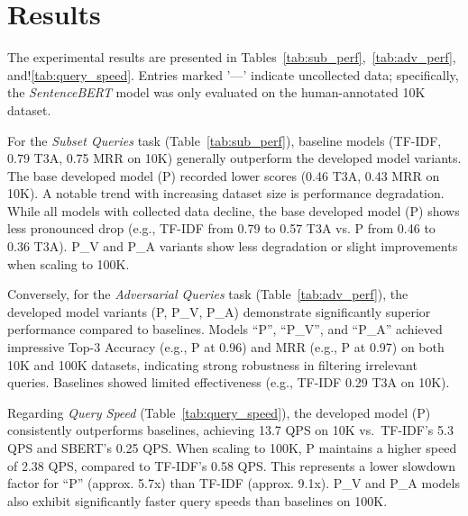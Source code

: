 \documentclass[11pt]{article}
\begin{document}
\section{Results}\label{sec:res}
The experimental results are presented in
Tables~\ref{tab:sub_perf},~\ref{tab:adv_perf}, and!\ref{tab:query_speed}.
Entries marked '---' indicate uncollected data; specifically, the
\emph{SentenceBERT} model was only evaluated on the human-annotated 10K
dataset.

For the \emph{Subset Queries} task (Table~\ref{tab:sub_perf}), baseline models
(TF-IDF, 0.79 T3A, 0.75 MRR on 10K) generally outperform the developed model
variants.
The base developed model (P) recorded lower scores (0.46 T3A, 0.43 MRR on 10K).
A notable trend with increasing dataset size is performance degradation.
While all models with collected data decline, the base developed model (P) shows
less pronounced drop (e.g., TF-IDF from 0.79 to 0.57 T3A vs. P from 0.46 to 0.36
T3A). P\_V and P\_A variants show less degradation or slight improvements when
scaling to 100K.

Conversely, for the \emph{Adversarial Queries} task (Table~\ref{tab:adv_perf}),
the developed model variants (P, P\_V, P\_A) demonstrate significantly superior
performance compared to baselines.
Models ``P'', ``P\_V'', and ``P\_A'' achieved impressive Top-3 Accuracy (e.g., P at
0.96) and MRR (e.g., P at 0.97) on both 10K and 100K datasets, indicating strong
robustness in filtering irrelevant queries.
Baselines showed limited effectiveness (e.g., TF-IDF 0.29 T3A on 10K).

Regarding \emph{Query Speed} (Table~\ref{tab:query_speed}), the developed model
(P) consistently outperforms baselines, achieving 13.7 QPS on 10K vs.\ TF-IDF's
5.3 QPS and SBERT's 0.25 QPS\@.
When scaling to 100K, P maintains a higher speed of 2.38 QPS, compared to
TF-IDF's 0.58 QPS\@.
This represents a lower slowdown factor for ``P'' (approx. 5.7x) than TF-IDF
(approx. 9.1x). P\_V and P\_A models also exhibit significantly faster query
speeds than baselines on 100K.
\end{document}
